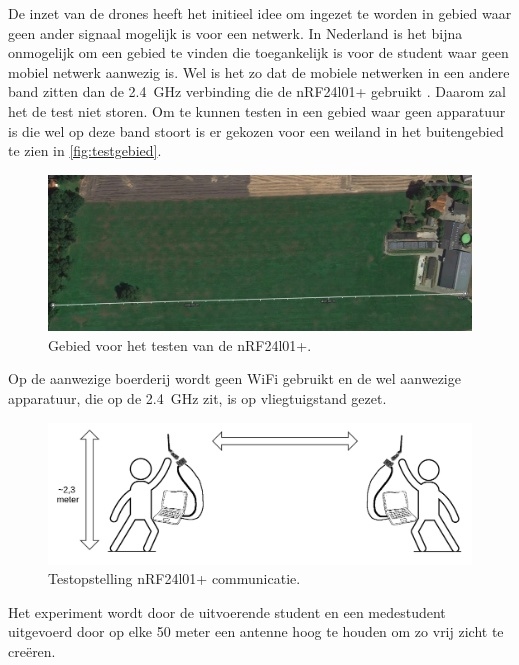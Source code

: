 \documentclass[a4paper, 11pt, oneside]{report}
\begin{document}
De inzet van de drones heeft het initieel idee om ingezet te worden in gebied waar geen ander signaal mogelijk is voor een netwerk. 
In Nederland is het bijna onmogelijk om een gebied te vinden die toegankelijk is voor de student waar geen mobiel netwerk aanwezig is.
Wel is het zo dat de mobiele netwerken in een andere band zitten dan de \SI{2,4}{\giga\hertz} verbinding die de nRF24l01+ gebruikt \cite{telefoonBand}. Daarom zal het de test niet storen. 
Om te kunnen testen in een gebied waar geen apparatuur is die wel op deze band stoort is er gekozen voor een weiland in het buitengebied te zien in \autoref{fig:testgebied}.

\begin{figure}[H]
	\begin{center}\includegraphics[width=.9\linewidth]{Afbeeldingen/meetmap.png}\end{center}
	\caption{Gebied voor het testen van de nRF24l01+.}
	\label{fig:testgebied}
\end{figure}

Op de aanwezige boerderij wordt geen WiFi gebruikt en de wel aanwezige apparatuur, die op de \SI{2,4}{\giga\hertz} zit, is op vliegtuigstand gezet.

\begin{figure}[H]
	\begin{center}\includegraphics[width=.9\linewidth]{Afbeeldingen/comopstelling.png}\end{center}
	\caption{Testopstelling nRF24l01+ communicatie.}
	\label{fig:testopstelling}
\end{figure}


Het experiment wordt door de uitvoerende student en een medestudent uitgevoerd door op elke 50 meter een antenne hoog te houden om zo vrij zicht te creëren.
\end{document}
